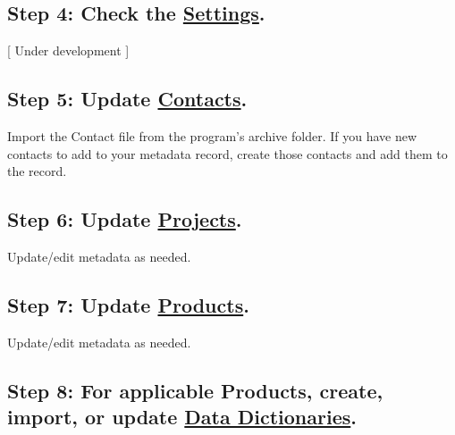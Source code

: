 \documentclass[
]{book}
\begin{document}
\hypertarget{step-4-check-the-settings.}{%
\subsection*{\texorpdfstring{Step 4: Check the \protect\hyperlink{settings}{Settings}.}{Step 4: Check the Settings.}}\label{step-4-check-the-settings.}}

{[} Under development {]}

\hypertarget{step-5-update-contacts.}{%
\subsection*{\texorpdfstring{Step 5: Update \protect\hyperlink{contact-entry-guidance}{Contacts}.}{Step 5: Update Contacts.}}\label{step-5-update-contacts.}}

Import the Contact file from the program's archive folder. If you have new contacts to add to your metadata record, create those contacts and add them to the record.

\hypertarget{step-6-update-projects.}{%
\subsection*{\texorpdfstring{Step 6: Update \protect\hyperlink{project-entry-guidance}{Projects}.}{Step 6: Update Projects.}}\label{step-6-update-projects.}}

Update/edit metadata as needed.

\hypertarget{step-7-update-products.}{%
\subsection*{\texorpdfstring{Step 7: Update \protect\hyperlink{product-entry-guidance}{Products}.}{Step 7: Update Products.}}\label{step-7-update-products.}}

Update/edit metadata as needed.

\hypertarget{step-8-for-applicable-products-create-import-or-update-data-dictionaries.}{%
\subsection*{\texorpdfstring{Step 8: For applicable Products, create, import, or update \protect\hyperlink{dictionary-entry-guidance}{Data Dictionaries}.}{Step 8: For applicable Products, create, import, or update Data Dictionaries.}}\label{step-8-for-applicable-products-create-import-or-update-data-dictionaries.}}
\end{document}
